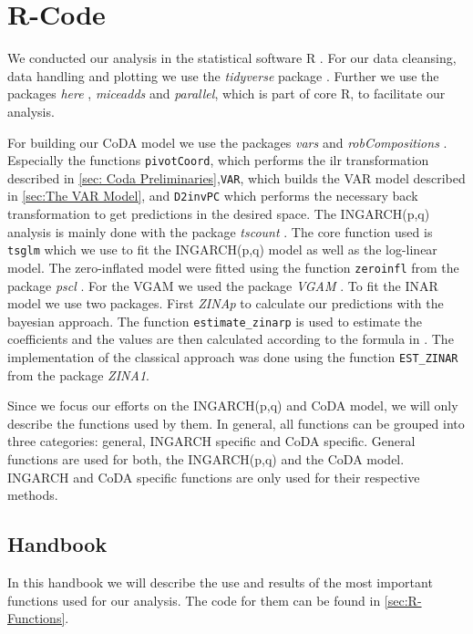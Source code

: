 \section{R-Code}
\label{sec:R-Code}

We conducted our analysis in the statistical software R \cite{R:2022}. For our data cleansing, data handling and plotting we use the \textit{tidyverse} package \cite{Tidyverse:2019}. Further we use the packages \textit{here} \cite{here:2020}, \textit{miceadds} \cite{Miceadds:2023} and \textit{parallel}, which is part of core R, to facilitate our analysis.  

For building our CoDA model we use the packages \textit{vars} \cite{VAR:2008,CoDAR2:2008} and \textit{robCompositions} \cite{RobComp:2011,CoDAR4:2018}. Especially the functions \texttt{pivotCoord}, which performs the ilr transformation described in \ref{sec: Coda Preliminaries},\texttt{VAR}, which builds the VAR model described in \ref{sec:The VAR Model}, and \texttt{D2invPC} which performs the necessary back transformation to get predictions in the desired space. The INGARCH(p,q) analysis is mainly done with the package \textit{tscount} \cite{Tscount:2017,Tscount:2020}. The core function used is \texttt{tsglm} which we use to fit the INGARCH(p,q) model as well as the log-linear model. The zero-inflated model were fitted using the function \texttt{zeroinfl} from the package \textit{pscl} \cite{Pscl:2008}. For the VGAM we used the package \textit{VGAM} \cite{RVGAM:2010}. To fit the INAR model we use two packages. First \textit{ZINAp} to calculate our predictions with the bayesian approach. The function \texttt{estimate\_zinarp} is used to estimate the coefficients and the values are then calculated according to the formula in \cite{Silva:2009}. The implementation of the classical approach was done using the function \texttt{EST\_ZINAR} from the package \textit{ZINA1}.

Since we focus our efforts on the INGARCH(p,q) and CoDA model, we will only describe the functions used by them. In general, all functions can be grouped into three categories: general, INGARCH specific and CoDA specific. General functions are used for both, the INGARCH(p,q) and the CoDA model. INGARCH and CoDA specific functions are only used for their respective methods.
\subsection{Handbook}
\label{sec:Handbook}

In this handbook we will describe the use and results of the most important functions used for our analysis.  The code for them can be found in \ref{sec:R-Functions}. 

